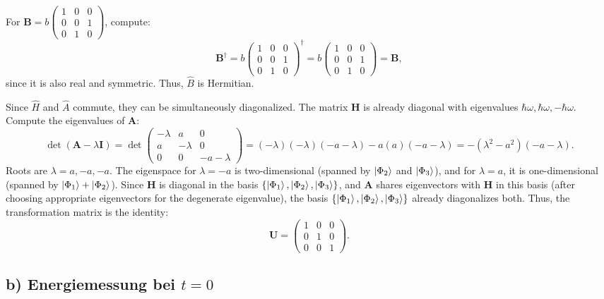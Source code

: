 \documentclass[a4paper,12pt]{article}
\begin{document}
For $\boldsymbol{B} = b \begin{pmatrix} 1 & 0 & 0 \\ 0 & 0 & 1 \\ 0 & 1 & 0 \end{pmatrix}$, compute:
\[
\boldsymbol{B}^\dagger = b \begin{pmatrix} 1 & 0 & 0 \\ 0 & 0 & 1 \\ 0 & 1 & 0 \end{pmatrix}^\dagger = b \begin{pmatrix} 1 & 0 & 0 \\ 0 & 0 & 1 \\ 0 & 1 & 0 \end{pmatrix} = \boldsymbol{B},
\]
since it is also real and symmetric. Thus, $\hat{B}$ is Hermitian.

Since $\hat{H}$ and $\hat{A}$ commute, they can be simultaneously diagonalized. The matrix $\boldsymbol{H}$ is already diagonal with eigenvalues $\hbar \omega, \hbar \omega, -\hbar \omega$. Compute the eigenvalues of $\boldsymbol{A}$:
\begin{dmath}
\det(\boldsymbol{A} - \lambda \boldsymbol{I}) = \det \begin{pmatrix} -\lambda & a & 0 \\ a & -\lambda & 0 \\ 0 & 0 & -a - \lambda \end{pmatrix}
= (-\lambda)(-\lambda)(-a - \lambda) - a(a)(-a - \lambda)
= -(\lambda^2 - a^2)(-a - \lambda).
\end{dmath}
Roots are $\lambda = a, -a, -a$. The eigenspace for $\lambda = -a$ is two-dimensional (spanned by $\ket{\Phi_2}$ and $\ket{\Phi_3}$), and for $\lambda = a$, it is one-dimensional (spanned by $\ket{\Phi_1} + \ket{\Phi_2}$). Since $\boldsymbol{H}$ is diagonal in the basis $\{\ket{\Phi_1}, \ket{\Phi_2}, \ket{\Phi_3}\}$, and $\boldsymbol{A}$ shares eigenvectors with $\boldsymbol{H}$ in this basis (after choosing appropriate eigenvectors for the degenerate eigenvalue), the basis $\{\ket{\Phi_1}, \ket{\Phi_2}, \ket{\Phi_3}\}$ already diagonalizes both. Thus, the transformation matrix is the identity:
\[
\boldsymbol{U} = \begin{pmatrix} 1 & 0 & 0 \\ 0 & 1 & 0 \\ 0 & 0 & 1 \end{pmatrix}.
\]

\subsection*{b) Energiemessung bei $t=0$}
\end{document}

